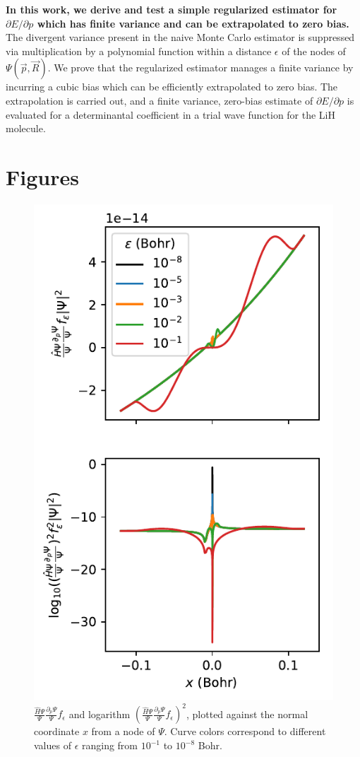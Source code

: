 \documentclass{article}
\begin{document}
\textbf{In this work, we derive and test a simple regularized estimator for $\partial E/\partial p$ which has finite variance and can be extrapolated to zero bias.}
The divergent variance present in the naive Monte Carlo estimator is suppressed via multiplication by a polynomial function within a distance $\epsilon$ of the nodes of $\Psi(\vec{p}, \vec{R})$. 
We prove that the regularized estimator manages a finite variance by incurring a cubic bias which can be efficiently extrapolated to zero bias.
The extrapolation is carried out, and a finite variance, zero-bias estimate of $\partial E/\partial p$ is evaluated for a determinantal coefficient in a trial wave function for the LiH molecule.


\section{Figures}
\begin{figure}
\centering
\includegraphics{../2_plots/viznode.pdf}
\caption{$\frac{\hat{H}\Psi}{\Psi}\frac{\partial_p \Psi}{\Psi} f_\epsilon$ and logarithm $(\frac{\hat{H}\Psi}{\Psi}\frac{\partial_p \Psi}{\Psi} f_\epsilon)^2$, plotted against the normal coordinate $x$ from a node of $\Psi$. Curve colors correspond to different values of $\epsilon$ ranging from $10^{-1}$ to $10^{-8}$ Bohr.}
\end{figure}
\end{document}
